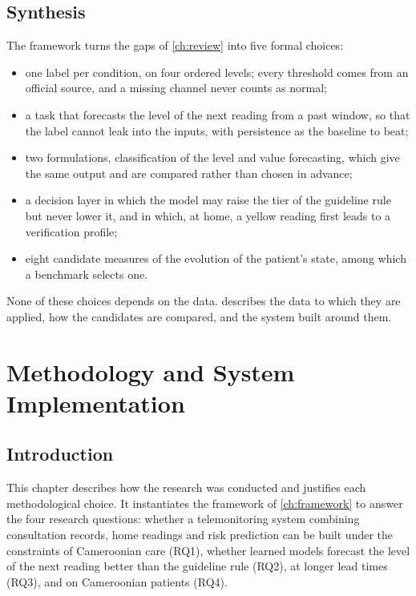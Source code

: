 \documentclass[11pt,a4paper,oneside]{report}
\begin{document}
\section{Synthesis}\label{sec:framework-synthesis}

The framework turns the gaps of \cref{ch:review} into five formal choices:
\begin{itemize}
  \item one label per condition, on four ordered levels; every threshold comes from an official source, and a missing channel never counts as normal;
  \item a task that forecasts the level of the next reading from a past window, so that the label cannot leak into the inputs, with persistence as the baseline to beat;
  \item two formulations, classification of the level and value forecasting, which give the same output and are compared rather than chosen in advance;
  \item a decision layer in which the model may raise the tier of the guideline rule but never lower it, and in which, at home, a yellow reading first leads to a verification profile;
  \item eight candidate measures of the evolution of the patient's state, among which a benchmark selects one.
\end{itemize}
None of these choices depends on the data.  describes the data to which they are applied, how the candidates are compared, and the system built around them.


\chapter{Methodology and System Implementation}\label{ch:methodology}\label{ch:data}\label{ch:architecture}

\section{Introduction}\label{sec:meth-intro}

This chapter describes how the research was conducted and justifies each methodological choice. It instantiates the framework of \cref{ch:framework} to answer the four research questions: whether a telemonitoring system combining consultation records, home readings and risk prediction can be built under the constraints of Cameroonian care (RQ1), whether learned models forecast the level of the next reading better than the guideline rule (RQ2), at longer lead times (RQ3), and on Cameroonian patients (RQ4).
\end{document}
